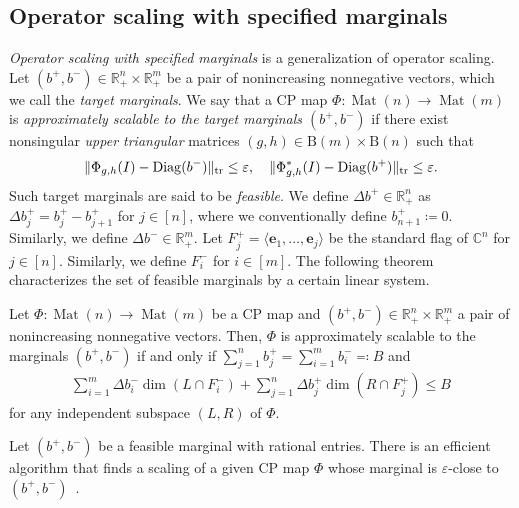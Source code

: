 \documentclass[a4paper,11pt]{article}
\numberwithin{equation}{section}
\newcommand{\C}{\mathbb{C}}
\newcommand{\R}{\mathbb{R}}
\newcommand{\be}{\mathbf{e}}
\newcommand{\eps}{\varepsilon}
\newcommand{\B}{\mathrm{B}}
\DeclareMathOperator{\Mat}{Mat}
\DeclareMathOperator{\tr}{tr}
\DeclareMathOperator{\Diag}{Diag}
\DeclarePairedDelimiter{\norm}{\lVert}{\rVert}
\begin{document}
\subsection{Operator scaling with specified marginals}
\emph{Operator scaling with specified marginals} is a generalization of operator scaling.
Let $(b^+, b^-) \in \R^n_+ \times \R^m_+$ be a pair of nonincreasing nonnegative vectors, which we call the \emph{target marginals}.
We say that a CP map $\Phi: \Mat(n) \to \Mat(m)$ is \emph{approximately scalable to the target marginals $(b^+, b^-)$} if there exist nonsingular \emph{upper triangular} matrices $(g, h) \in \B(m) \times \B(n)$ such that 
\begin{align}
\norm{\Phi_{g,h}(I) - \Diag(b^-)}_{\tr} \leq \eps, \quad \norm{\Phi_{g,h}^*(I) - \Diag(b^+)}_{\tr} \leq \eps.
\end{align}
Such target marginals are said to be \emph{feasible}.
We define $\Delta b^+ \in \R_+^n$ as $\Delta b^+_j = b^+_j - b^+_{j+1}$ for $j \in [n]$, where we conventionally define $b^+_{n+1} \coloneqq 0$.
Similarly, we define $\Delta b^- \in \R_+^m$.
Let $F^+_j = \langle \be_1, \dots, \be_j \rangle$ be the standard flag of $\C^n$ for $j \in [n]$.
Similarly, we define $F^-_i$ for $i \in [m]$.
The following theorem characterizes the set of feasible marginals by a certain linear system.

\begin{theorem}\label{thm:opscaling-marginals}
    Let $\Phi: \Mat(n) \to \Mat(m)$ be a CP map and $(b^+, b^-) \in \R^n_+ \times \R^m_+$ a pair of nonincreasing nonnegative vectors.
    Then, $\Phi$ is approximately scalable to the marginals $(b^+, b^-)$ if and only if $\sum_{j=1}^n b^+_j = \sum_{i=1}^m b^-_i \eqqcolon B$ and 
    \begin{align}
        \sum_{i=1}^m \Delta b^-_i \dim(L \cap F^-_i) +  \sum_{j=1}^n \Delta b^+_j \dim(R \cap F^+_j) \leq B
    \end{align}
    for any independent subspace $(L,R)$ of $\Phi$.
\end{theorem}


Let $(b^+, b^-)$ be a feasible marginal with rational entries.
There is an efficient algorithm that finds a scaling of a given CP map $\Phi$ whose marginal is $\eps$-close to $(b^+, b^-)$~\citep{Franks2018,Burgisser2018a}.
\end{document}
